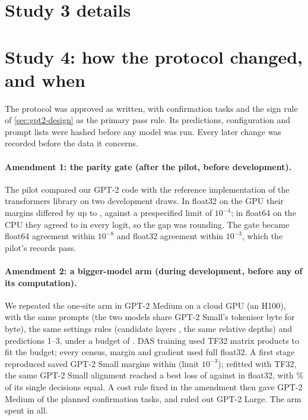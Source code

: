 \section{Study 3 details}\label{app:multisite}


\section{Study 4: how the protocol changed, and when}\label{app:gpt2-history}

The protocol was approved as written, with \NTasksConf{} confirmation tasks and the sign rule of
\cref{sec:gpt2-design} as the primary pass rule. Its predictions, configuration and prompt lists were hashed before any
model was run. Every later change was recorded before the data it concerns.

\paragraph{Amendment 1: the parity gate (after the pilot, before development).} The pilot compared our GPT-2 code with
the reference implementation of the transformers library on two development draws. In float32 on the GPU their margins
differed by up to \PilotMarginGap, against a prespecified limit of $10^{-4}$; in float64 on the CPU they agreed to
\ParityFloatSixtyFour{} in every logit, so the gap was rounding. The gate became float64 agreement within $10^{-8}$ and
float32 agreement within $10^{-3}$, which the pilot's records pass.

\paragraph{Amendment 2: a bigger-model arm (during development, before any of its computation).} We
repeated the one-site arm in GPT-2 Medium on a cloud GPU (an H100), with the same prompts (the two models share
GPT-2 Small's tokeniser byte for byte), the same settings rules (candidate layers \CandMedium{}, the same relative
depths) and predictions 1--3, under a budget of \ArmBudget. DAS training used TF32 matrix products to fit the budget;
every census, margin and gradient used full float32. A first stage reproduced \NReproQueries{} saved GPT-2 Small
margins within \CheckReproGap{} (limit $10^{-3}$); refitted with TF32, the same GPT-2 Small alignment reached a best
loss of \TfLoss{} against \LocalLoss{} in float32, with \TfAgreePct\% of its single decisions equal. A cost rule fixed
in the amendment then gave GPT-2 Medium \NTasksMedium{} of the planned \NTasksConf{} confirmation tasks, and ruled out
GPT-2 Large. The arm spent \ArmSpent{} in all.

